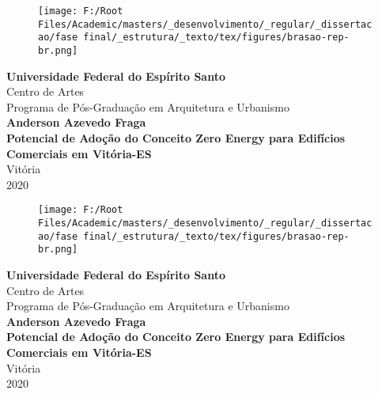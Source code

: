 \begin{titlepage}
    \begin{center}
        \begin{figure}
            \centering
            \texttt{[image: F:/Root Files/Academic/masters/\_desenvolvimento/\_regular/\_dissertacao/fase final/\_estrutura/\_texto/tex/figures/brasao-rep-br.png]}
        \end{figure}
        \vspace*{0.1cm}
        \textbf{\large Universidade Federal do Espírito Santo}\\
        \large Centro de Artes\\
        \large Programa de Pós-Graduação em Arquitetura e Urbanismo\\
        \vspace*{3cm}
        \textbf{\large Anderson Azevedo Fraga}\\
        \vspace*{4cm}
        \textbf{Potencial de Adoção do Conceito Zero Energy para Edifícios Comerciais em Vitória-ES}\\
        \vfill %
        Vitória\\
        2020\pagebreak

        \begin{figure}
            \thispagestyle{empty} %
            \centering
            \texttt{[image: F:/Root Files/Academic/masters/\_desenvolvimento/\_regular/\_dissertacao/fase final/\_estrutura/\_texto/tex/figures/brasao-rep-br.png]}
        \end{figure}
        \vspace*{0.1cm}
        \textbf{\large Universidade Federal do Espírito Santo}\\
        \large Centro de Artes\\
        \large Programa de Pós-Graduação em Arquitetura e Urbanismo\\
        \vspace*{3cm}
        \textbf{\large Anderson Azevedo Fraga}\\
        \vspace*{4cm}
        \textbf{Potencial de Adoção do Conceito Zero Energy para Edifícios Comerciais em Vitória-ES}\\
        \vfill %
        Vitória\\
        2020\pagebreak

    \end{center}
\end{titlepage}